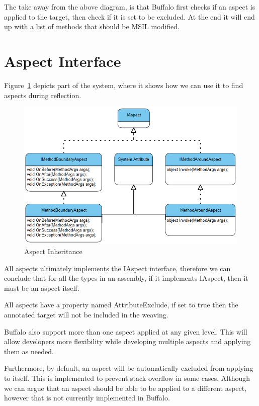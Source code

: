 The take away from the above diagram, is that Buffalo first checks if an aspect is applied to the target, then check if it is set to be excluded. At the end it will end up with a list of methods that should be MSIL modified.

\section{Aspect Interface}

Figure~\ref{uml01} depicts part of the system, where it shows how we can use it to find aspects during reflection.

\begin{figure}[H]
  \includegraphics[scale=1.0]{Uml01.PNG}
  \centering
  \caption{Aspect Inheritance\label{uml01}}
\end{figure}

All aspects ultimately implements the IAspect interface, therefore we can conclude that for all the types in an assembly, if it implements IAspect, then it must be an aspect itself.

All aspects have a property named AttributeExclude, if set to true then the annotated target will not be included in the weaving.

Buffalo also support more than one aspect applied at any given level. This will allow developers more flexibility while developing multiple aspects and applying them as needed.

Furthermore, by default, an aspect will be automatically excluded from applying to itself. This is implemented to prevent stack overflow in some cases. Although we can argue that an aspect should be able to be applied to a different aspect, however that is not currently implemented in Buffalo.


